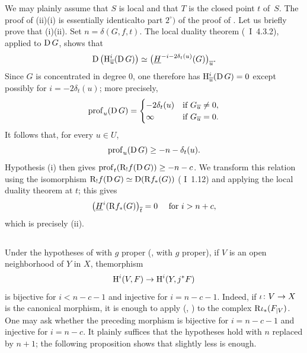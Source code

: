 We may plainly assume that $S$ is local and that $T$ is the closed point $t$ of~$S$. The proof of \textup{(ii)}\ALORS\textup{(i)} is essentially identical\pageoriginale to part $2^\circ)$ of the proof of . Let us briefly prove that \textup{(i)}\ALORS \textup{(ii)}. Set $n=\delta(G,f,t)$. The local duality theorem (~I~4.3.2), applied to $\D G$, shows that
$$
\D\big(\H_{\overline{u}}^{i}(\D G)\big) \simeq\big(\underline{H}^{-i-2\delta_{t}(u)}(G)\big)_{\overline{u}}.
$$
Since $G$ is concentrated in degree $0$, one therefore has $\H_{\overline{u}}^{i}(\D G)=0$ except possibly for $i=-2\delta_{t}(u)$; more precisely,
{\[
\prof_{u}(\D G)=
\begin{cases}
-2\delta_{t}(u) &\text{if } G_{\overline{u}}\neq 0, \\
\infty &\text{if } G_{\overline{u}}=0.
\end{cases}
\]}
It follows that, for every $u\in U$,
$$
\prof_{u}(\D G)\geq -n-\delta_{t}(u).
$$
Hypothesis \textup{(i)} then gives $\prof_{t}(\R_{!}f(\D G))\geq -n-c$. We transform this relation using the isomorphism $\R_{!}f(\D G)\simeq\D(\R f_{\ast}(G))$ ( I~1.12) and applying the local duality theorem at $t$; this gives
$$
\big(\underline{H}^{i}(\R f_{\ast}(G)\big)_{\overline{t}}=0\quad\textrm{ for }i>n+c,
$$
which is precisely \textup{(ii)}.

\subsection{\texorpdfstring{}{XIV.4.8}} \label{XIV.4.8} Under the hypotheses of  with $g$ proper (\resp {}, \resp {} with $g$ proper), if $V$ is an open neighborhood of $Y$ in $X$, the\pageoriginaled morphism
$$
\H^{i}(V, F)\to\H^{i}(Y, j^{\ast}F)$$
is bijective for $i<n-c-1$ and injective for $i=n-c-1$. Indeed, if $\sisi{i}{\iota}\colon V\to X$ is the canonical morphism, it is enough to apply  (\resp {}, \resp {}) to the complex $\R \sisi{i}{\iota}_{\ast}(\sisi{F{|V}}{F_{|V}})$. One may ask whether the preceding morphism is bijective for $i=n-c-1$ and injective for $i=n-c$. It plainly suffices that the hypotheses hold with $n$ replaced by $n+1$; the following proposition shows that slightly less is enough.


